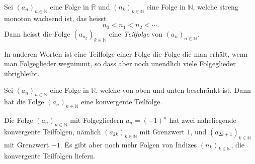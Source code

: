 \documentclass[../main.tex]{subfiles}
\begin{document}
\begin{definition}
  Sei ${(a_n)}_{n \in \mathbb{N}}$ eine Folge in $\mathbb{R}$ 
  und ${(n_k)}_{k \in \mathbb{N}}$ eine Folge in $\mathbb{N}$,
  welche streng monoton wachsend ist, das heisst
  \[
    n_0 < n_1 < n_2 < \cdots.
  \]
  Dann heisst die Folge ${(a_{n_k})}_{k \in \mathbb{N}}$ 
eine \emph{Teilfolge} von ${(a_n)}_{n \in \mathbb{N}}$.
\end{definition}

In anderen Worten ist eine Teilfolge einer Folge
die Folge die man erhält, wenn man Folgeglieder
wegnimmt, so dass aber noch unendlich viele
Folgeglieder übrigbleibt.

\begin{theorem}\label{thm:bolzano-weierstrass}
  Sei ${(a_n)}_{n \in \mathbb{N}}$ eine Folge in $\mathbb{R}$,
  welche von oben und unten beschränkt ist.
  Dann hat die Folge ${(a_n)}_{n \in \mathbb{N}}$
  eine konvergente Teilfolge.
\end{theorem}

\begin{example}
  Die Folge ${(a_n)}_{n \in \mathbb{N}}$ mit Folgegliedern
  $a_n = {(-1)}^n$ hat zwei naheliegende konvergente Teilfolgen,
  nämlich ${(a_{2k})}_{k \in \mathbb{N}}$ mit Grenzwert $1$,
  und ${(a_{2k+1})}_{k \in \mathbb{N}}$ mit Grenzwert $-1$.
  Es gibt aber noch mehr Folgen von Indizes 
  ${(n_k)}_{k \in \mathbb{N}}$, die
  konvergente Teilfolgen liefern.
\end{example}
\end{document}
